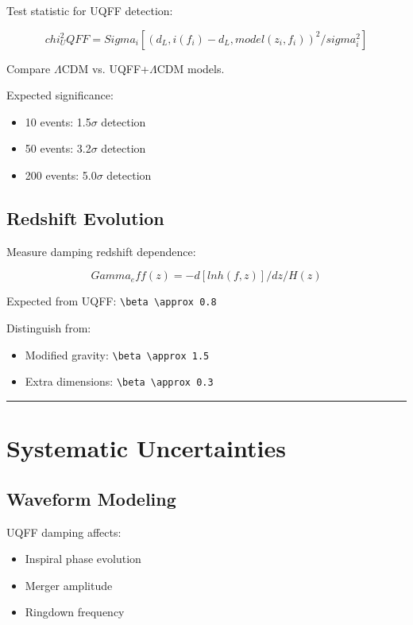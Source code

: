 \documentclass[12pt,a4paper]{article}
\begin{document}
Test statistic for UQFF detection:

\begin{equation}
chi^2_UQFF = Sigma_i [(d_L,i(f_i) - d_L,model(z_i,f_i))^2 / sigma_i^2]
\end{equation}

Compare $\Lambda$CDM vs. UQFF+$\Lambda$CDM models.

Expected significance:

\begin{itemize}
  \item 10 events: 1.5$\sigma$ detection
  \item 50 events: 3.2$\sigma$ detection
  \item 200 events: 5.0$\sigma$ detection
\end{itemize}

\subsection{Redshift Evolution}

Measure damping redshift dependence:

\begin{equation}
Gamma_eff(z) = -d[ln h(f,z)]/dz / H(z)
\end{equation}

Expected from UQFF: \texttt{\textbackslash beta \textbackslash approx 0.8}

Distinguish from:

\begin{itemize}
  \item Modified gravity: \texttt{\textbackslash beta \textbackslash approx 1.5}
  \item Extra dimensions: \texttt{\textbackslash beta \textbackslash approx 0.3}
\end{itemize}

\medskip\hrule\medskip

\section{Systematic Uncertainties}

\subsection{Waveform Modeling}

UQFF damping affects:

\begin{itemize}
  \item Inspiral phase evolution
  \item Merger amplitude
  \item Ringdown frequency
\end{itemize}
\end{document}
